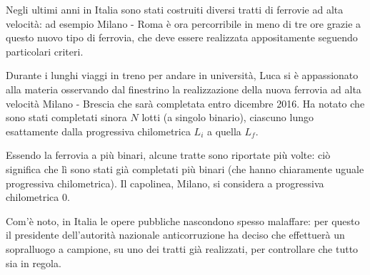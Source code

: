 \usepackage{xcolor}
\usepackage{afterpage}
\usepackage{pifont,mdframed}
\usepackage[bottom,symbol]{footmisc}

\makeatletter
\gdef\this@inputfilename{input.txt}
\gdef\this@outputfilename{output.txt}
\makeatother


\newcommand{\inputfile}{\texttt{input.txt}}
\newcommand{\outputfile}{\texttt{output.txt}}

\newenvironment{warning}
  {\par\begin{mdframed}[linewidth=2pt,linecolor=gray]%
    \begin{list}{}{\leftmargin=1cm
                   \labelwidth=\leftmargin}\item[\Large\ding{43}]}
  {\end{list}\end{mdframed}\par}


Negli ultimi anni in Italia sono stati costruiti diversi tratti di ferrovie ad alta velocità: ad esempio Milano - Roma è ora percorribile in meno di tre ore grazie a questo nuovo tipo di ferrovia, che deve essere realizzata appositamente seguendo particolari criteri.

Durante i lunghi viaggi in treno per andare in università, Luca si è appassionato alla materia osservando dal finestrino la realizzazione della nuova ferrovia ad alta velocità Milano - Brescia che sarà completata entro dicembre 2016. Ha notato che sono stati completati sinora $N$ lotti (a singolo binario), ciascuno lungo esattamente dalla progressiva chilometrica $L_i$ a quella $L_f$.

Essendo la ferrovia a più binari, alcune tratte sono riportate più volte: ciò significa che lì sono stati già completati più binari (che hanno chiaramente uguale progressiva chilometrica).
Il capolinea, Milano, si considera a progressiva chilometrica 0.

Com'è noto, in Italia le opere pubbliche nascondono spesso malaffare: per questo il presidente dell'autorità nazionale anticorruzione ha deciso che effettuerà un sopralluogo a campione, su uno dei tratti già realizzati, per controllare che tutto sia in regola.

